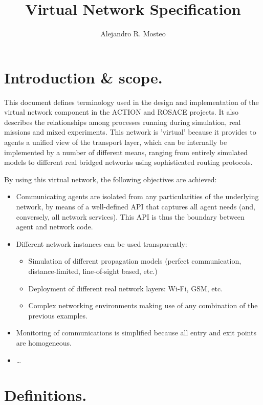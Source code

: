\documentclass[a4paper,11pt]{article}
\newcommand{\myauthor}{Alejandro R. Mosteo}
\newcommand{\mytitle}{Virtual Network Specification}
\begin{document}
\author{\myauthor}
\title{\mytitle}
\maketitle

\tableofcontents

\section{Introduction \& scope.}

This document defines terminology used in the design and implementation of the virtual network component in the ACTION and ROSACE projects. It also describes the relationships among processes running during simulation, real missions and mixed experiments. This network is 'virtual' because it provides to agents a unified view of the transport layer, which can be internally be implemented by a number of different means, ranging from entirely simulated models to different real bridged networks using sophisticated routing protocols. 

By using this virtual network, the following objectives are achieved:

\begin{itemize}
    \item Communicating agents are isolated from any particularities of the underlying network, by means of a well-defined API that captures all agent needs (and, conversely, all network services). This API is thus the boundary between agent and network code.
    \item Different network instances can be used transparently:
        \begin{itemize}
            \item Simulation of different propagation models (perfect communication, distance-limited, line-of-sight based, etc.)
            \item Deployment of different real network layers: Wi-Fi, GSM, etc.
            \item Complex networking environments making use of any combination of the previous examples.
        \end{itemize}
    \item Monitoring of communications is simplified because all entry and exit points are homogeneous.
    \item \dots
\end{itemize}


\section{Definitions.}
\end{document}
